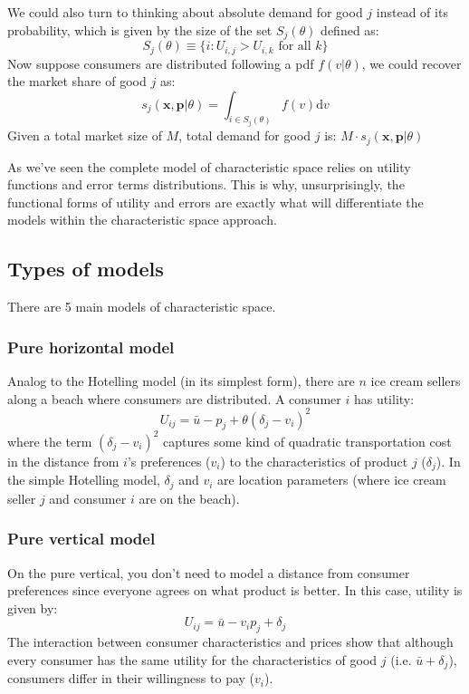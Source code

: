 \documentclass[12pt]{report}
\def\D{\mathrm{d}}
\def\D{\mathrm{d}}
\begin{document}
We could also turn to thinking about absolute demand for good $j$ instead of its probability, which is given by the size of the set $S_j(\theta)$ defined as: $$ S_j(\theta) \equiv \{i : U_{i,j} > U_{i, k} \text{ for all } k \}$$ Now suppose consumers are distributed following a pdf $f(v\vert \theta)$, we could recover the market share of good $j$ as: $$ s_j(\mathbf{x}, \mathbf{p}\vert \theta) = \int_{i\in S_j(\theta)} f(v)\D v $$ Given a total market size of $M$, total demand for good $j$ is: $M\cdot s_j(\mathbf{x}, \mathbf{p}\vert \theta)$

As we've seen the complete model of characteristic space relies on utility functions and error terms distributions. This is why, unsurprisingly, the functional forms of utility and errors are exactly what will differentiate the models within the characteristic space approach.

\subsection{Types of models}

There are 5 main models of characteristic space.

\subsubsection{Pure horizontal model}

Analog to the Hotelling model (in its simplest form), there are $n$ ice cream sellers along a beach where consumers are distributed. A consumer $i$ has utility: $$U_{ij} = \bar u - p_j + \theta(\delta_j - v_i)^2 $$ where the term $(\delta_j - v_i)^2$ captures some kind of quadratic transportation cost in the distance from $i$'s preferences ($v_i$) to the characteristics of product $j$ ($\delta_j$). In the simple Hotelling model, $\delta_j$ and $v_i$ are location parameters (where ice cream seller $j$ and consumer $i$ are on the beach).

\subsubsection{Pure vertical model}

On the pure vertical, you don't need to model a distance from consumer preferences since everyone agrees on what product is better. In this case, utility is given by: $$ U_{ij} = \bar u - v_ip_j + \delta_j $$ The interaction between consumer characteristics and prices show that although every consumer has the same utility for the characteristics of good $j$ (i.e. $\bar u + \delta_j$), consumers differ in their willingness to pay ($v_i$).
\end{document}

